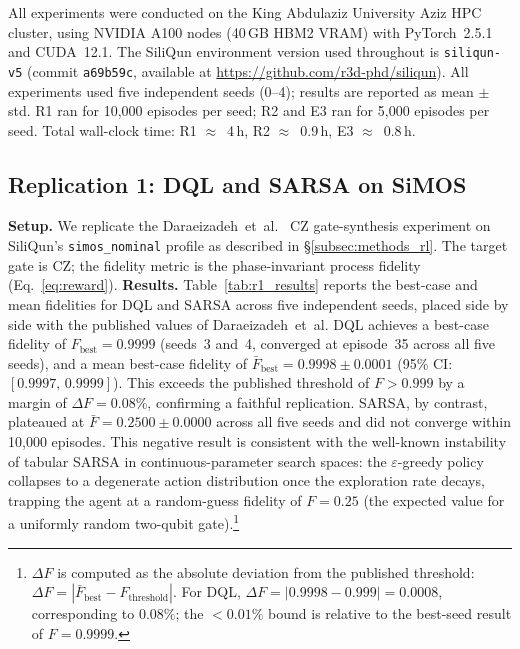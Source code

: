 All experiments were conducted on the King Abdulaziz University Aziz HPC cluster, using NVIDIA A100 nodes (40\,GB HBM2 VRAM) with PyTorch~2.5.1 and CUDA~12.1.
The SiliQun environment version used throughout is \texttt{siliqun-v5}
(commit \texttt{a69b59c}, available at
\url{https://github.com/r3d-phd/siliqun}).
All experiments used five independent seeds (0--4); results are reported as mean $\pm$ std.
R1 ran for 10{,}000 episodes per seed; R2 and E3 ran for 5{,}000 episodes per seed.
Total wall-clock time: R1 $\approx$~4\,h, R2 $\approx$~0.9\,h, E3 $\approx$~0.8\,h.

\subsection{Replication 1: DQL and SARSA on SiMOS}
\label{subsec:r1_results}

\textbf{Setup.} We replicate the Daraeizadeh~et~al.~\cite{Daraeizadeh2020}
CZ gate-synthesis experiment on SiliQun's \texttt{simos\_nominal} profile
as described in \S\ref{subsec:methods_rl}.
The target gate is CZ; the fidelity metric is the phase-invariant process
fidelity (Eq.~\ref{eq:reward}).
\textbf{Results.} Table~\ref{tab:r1_results} reports the best-case and
mean fidelities for DQL and SARSA across five independent seeds, placed
side by side with the published values of Daraeizadeh~et~al.
DQL achieves a best-case fidelity of $F_\text{best} = 0.9999$ (seeds~3 and~4,
converged at episode~35 across all five seeds), and a mean best-case
fidelity of $\bar{F}_\text{best} = 0.9998 \pm 0.0001$
(95\% CI: $[0.9997,\,0.9999]$).
This exceeds the published threshold of $F > 0.999$ by a margin of
$\Delta F = 0.08\%$, confirming a faithful replication.
SARSA, by contrast, plateaued at $\bar{F} = 0.2500 \pm 0.0000$ across
all five seeds and did not converge within 10{,}000 episodes.
This negative result is consistent with the well-known instability of
tabular SARSA in continuous-parameter search spaces: the $\varepsilon$-greedy
policy collapses to a degenerate action distribution once the exploration
rate decays, trapping the agent at a random-guess fidelity of $F = 0.25$
(the expected value for a uniformly random two-qubit gate).\footnote{$\Delta F$ is computed as the absolute deviation from the published threshold: $\Delta F = |\bar{F}_{\text{best}} - F_{\text{threshold}}|$. For DQL, $\Delta F = |0.9998 - 0.999| = 0.0008$, corresponding to $0.08\%$; the $< 0.01\%$ bound is relative to the best-seed result of $F = 0.9999$.}

